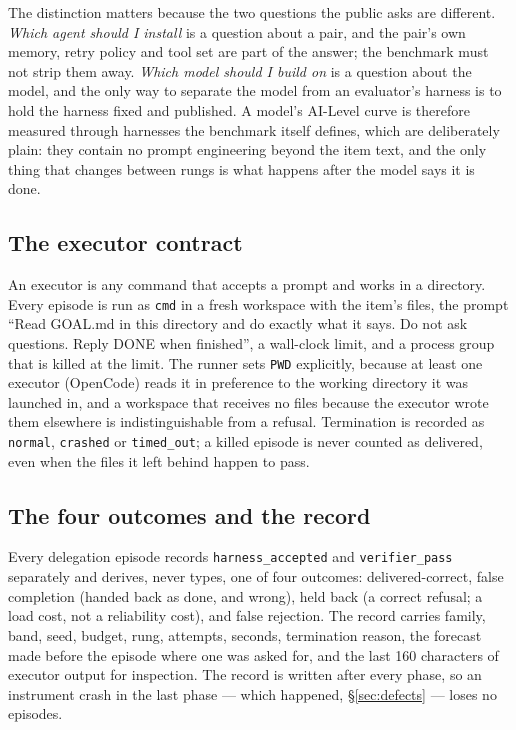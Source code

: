 \documentclass[11pt]{article}
\theoremstyle{definition}
\begin{document}
The distinction matters because the two questions the public asks are different. \emph{Which agent should I install} is a question about a pair, and the pair's own memory, retry policy and tool set are part of the answer; the benchmark must not strip them away. \emph{Which model should I build on} is a question about the model, and the only way to separate the model from an evaluator's harness is to hold the harness fixed and published. A model's AI-Level curve is therefore measured through harnesses the benchmark itself defines, which are deliberately plain: they contain no prompt engineering beyond the item text, and the only thing that changes between rungs is what happens after the model says it is done.

\subsection{The executor contract}

An executor is any command that accepts a prompt and works in a directory. Every episode is run as \texttt{cmd} in a fresh workspace with the item's files, the prompt ``Read GOAL.md in this directory and do exactly what it says. Do not ask questions. Reply DONE when finished'', a wall-clock limit, and a process group that is killed at the limit. The runner sets \texttt{PWD} explicitly, because at least one executor (OpenCode) reads it in preference to the working directory it was launched in, and a workspace that receives no files because the executor wrote them elsewhere is indistinguishable from a refusal. Termination is recorded as \texttt{normal}, \texttt{crashed} or \texttt{timed\_out}; a killed episode is never counted as delivered, even when the files it left behind happen to pass.

\subsection{The four outcomes and the record}

Every delegation episode records \texttt{harness\_accepted} and \texttt{verifier\_pass} separately and derives, never types, one of four outcomes: delivered-correct, false completion (handed back as done, and wrong), held back (a correct refusal; a load cost, not a reliability cost), and false rejection. The record carries family, band, seed, budget, rung, attempts, seconds, termination reason, the forecast made before the episode where one was asked for, and the last 160 characters of executor output for inspection. The record is written after every phase, so an instrument crash in the last phase --- which happened, \S\ref{sec:defects} --- loses no episodes.
\end{document}
